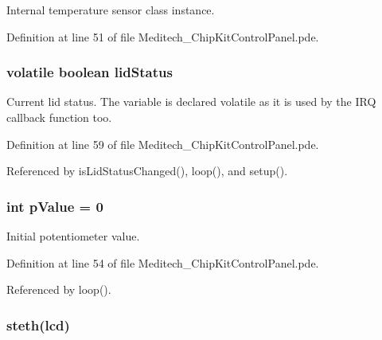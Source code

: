 Internal temperature sensor class instance. 



Definition at line 51 of file Meditech\-\_\-\-Chip\-Kit\-Control\-Panel.\-pde.

\hypertarget{_meditech___chip_kit_control_panel_8pde_adea51712174a5f82a31231a67e0d4608}{
\subsubsection[{lid\-Status}]{\setlength{\rightskip}{0pt plus 5cm}volatile boolean lid\-Status}}\label{_meditech___chip_kit_control_panel_8pde_adea51712174a5f82a31231a67e0d4608}


Current lid status. The variable is declared volatile as it is used by the I\-R\-Q callback function too. 



Definition at line 59 of file Meditech\-\_\-\-Chip\-Kit\-Control\-Panel.\-pde.



Referenced by is\-Lid\-Status\-Changed(), loop(), and setup().

\hypertarget{_meditech___chip_kit_control_panel_8pde_a3134d7e85042180eb421c3f6ee88d3b3}{
\subsubsection[{p\-Value}]{\setlength{\rightskip}{0pt plus 5cm}int p\-Value = 0}}\label{_meditech___chip_kit_control_panel_8pde_a3134d7e85042180eb421c3f6ee88d3b3}


Initial potentiometer value. 



Definition at line 54 of file Meditech\-\_\-\-Chip\-Kit\-Control\-Panel.\-pde.



Referenced by loop().

\hypertarget{_meditech___chip_kit_control_panel_8pde_ac2215fe61cf27d0fc83fa54cf1db73fc}{
\subsubsection[{steth}]{ steth({\bf lcd})}}\label{_meditech___chip_kit_control_panel_8pde_ac2215fe61cf27d0fc83fa54cf1db73fc}


